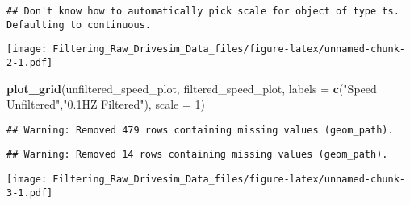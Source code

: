 \documentclass[]{article}
\newenvironment{Shaded}{\begin{snugshade}}{\end{snugshade}}
\newcommand{\DataTypeTok}[1]{\textcolor[rgb]{0.13,0.29,0.53}{#1}}
\newcommand{\DecValTok}[1]{\textcolor[rgb]{0.00,0.00,0.81}{#1}}
\newcommand{\KeywordTok}[1]{\textcolor[rgb]{0.13,0.29,0.53}{\textbf{#1}}}
\newcommand{\NormalTok}[1]{#1}
\newcommand{\StringTok}[1]{\textcolor[rgb]{0.31,0.60,0.02}{#1}}
\begin{document}
\begin{verbatim}
## Don't know how to automatically pick scale for object of type ts. Defaulting to continuous.
\end{verbatim}

\texttt{[image: Filtering\_Raw\_Drivesim\_Data\_files/figure-latex/unnamed-chunk-2-1.pdf]}

\begin{Shaded}
\begin{Highlighting}[]
\KeywordTok{plot_grid}\NormalTok{(unfiltered_speed_plot, filtered_speed_plot, }\DataTypeTok{labels =}  \KeywordTok{c}\NormalTok{(}\StringTok{"Speed Unfiltered"}\NormalTok{,}\StringTok{"0.1HZ Filtered"}\NormalTok{), }\DataTypeTok{scale =} \DecValTok{1}\NormalTok{)}
\end{Highlighting}
\end{Shaded}

\begin{verbatim}
## Warning: Removed 479 rows containing missing values (geom_path).
\end{verbatim}

\begin{verbatim}
## Warning: Removed 14 rows containing missing values (geom_path).
\end{verbatim}

\texttt{[image: Filtering\_Raw\_Drivesim\_Data\_files/figure-latex/unnamed-chunk-3-1.pdf]}
\end{document}
